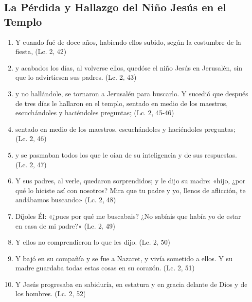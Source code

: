\documentclass[a4paper,11pt]{article}
\begin{document}
    \subsection*{\hfil La Pérdida y Hallazgo del Niño Jesús en el Templo \hfil}
      
      \begin{enumerate}
        \item Y cuando fué de doce años, habiendo ellos subido, según la costumbre de la fiesta, (Lc. 2, 42)
        
        \item y acabados los días, al volverse ellos, quedóse el niño Jesús en Jerusalén, sin que lo advirtiesen sus padres. (Lc. 2, 43)
        
        \item y no hallándole, se tornaron a Jerusalén para buscarlo. Y sucedió que después de tres días le hallaron en el templo,
        sentado en medio de los maestros, escuchándoles y haciéndoles preguntas; (Lc. 2, 45-46)
        
        \item sentado en medio de los maestros, escuchándoles y haciéndoles preguntas; (Lc. 2, 46)
        
        \item y se pasmaban todos los que le oían de su inteligencia y de sus respuestas. (Lc. 2, 47)

        \item Y sus padres, al verle, quedaron sorprendidos; y le dijo su madre: «hijo, ¿por qué lo hiciste así con nosotros? Mira que tu padre
        y yo, llenos de aflicción, te andábamos buscando» (Lc. 2, 48)
        
        \item Díjoles Él: «¿pues por qué me buscabais? ¿No sabíais que había yo de estar en casa de mi padre?» (Lc. 2, 49)
        
        \item Y ellos no comprendieron lo que les dijo. (Lc. 2, 50)
        
        \item Y bajó en su compañía y se fue a Nazaret, y vivía sometido a ellos. Y su madre guardaba todas estas
        cosas en su corazón. (Lc. 2, 51)
        
        \item Y Jesús progresaba en sabiduría, en estatura y en gracia delante de Dios y de los hombres. (Lc. 2, 52)
      \end{enumerate}
\end{document}
